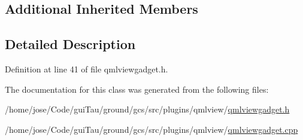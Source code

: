 \subsection*{Additional Inherited Members}


\subsection{Detailed Description}


Definition at line 41 of file qmlviewgadget.\-h.



The documentation for this class was generated from the following files\-:\begin{DoxyCompactItemize}
\item 
/home/jose/\-Code/gui\-Tau/ground/gcs/src/plugins/qmlview/\hyperlink{qmlviewgadget_8h}{qmlviewgadget.\-h}\item 
/home/jose/\-Code/gui\-Tau/ground/gcs/src/plugins/qmlview/\hyperlink{qmlviewgadget_8cpp}{qmlviewgadget.\-cpp}\end{DoxyCompactItemize}
